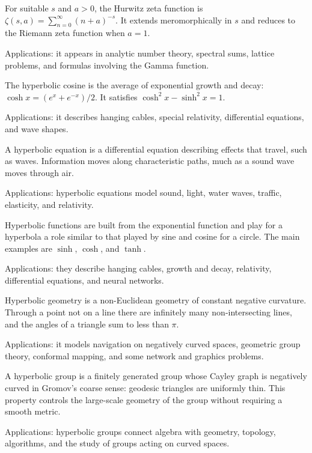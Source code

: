 For suitable $s$ and $a>0$, the Hurwitz zeta function is $\zeta(s,a)=\sum_{n=0}^{\infty}(n+a)^{-s}$. It extends meromorphically in $s$ and reduces to the Riemann zeta function when $a=1$. \par\noindent Applications: it appears in analytic number theory, spectral sums, lattice problems, and formulas involving the Gamma function.

The hyperbolic cosine is the average of exponential growth and decay: $\cosh x=(e^x+e^{-x})/2$. It satisfies $\cosh^2x-\sinh^2x=1$. \par\noindent Applications: it describes hanging cables, special relativity, differential equations, and wave shapes.

A hyperbolic equation is a differential equation describing effects that travel, such as waves. Information moves along characteristic paths, much as a sound wave moves through air. \par\noindent Applications: hyperbolic equations model sound, light, water waves, traffic, elasticity, and relativity.

Hyperbolic functions are built from the exponential function and play for a hyperbola a role similar to that played by sine and cosine for a circle. The main examples are $\sinh$, $\cosh$, and $\tanh$. \par\noindent Applications: they describe hanging cables, growth and decay, relativity, differential equations, and neural networks.

Hyperbolic geometry is a non-Euclidean geometry of constant negative curvature. Through a point not on a line there are infinitely many non-intersecting lines, and the angles of a triangle sum to less than $\pi$. \par\noindent Applications: it models navigation on negatively curved spaces, geometric group theory, conformal mapping, and some network and graphics problems.

A hyperbolic group is a finitely generated group whose Cayley graph is negatively curved in Gromov's coarse sense: geodesic triangles are uniformly thin. This property controls the large-scale geometry of the group without requiring a smooth metric. \par\noindent Applications: hyperbolic groups connect algebra with geometry, topology, algorithms, and the study of groups acting on curved spaces.

